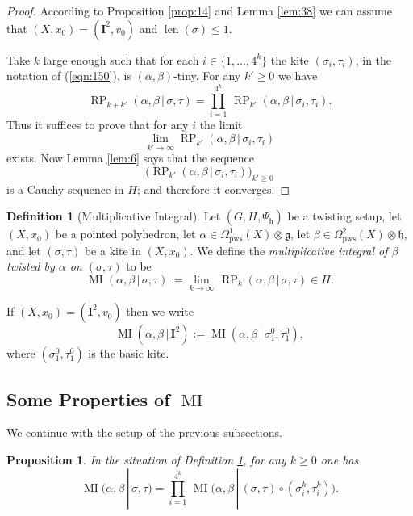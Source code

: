 \documentclass[10pt, a4paper]{amsart}
\newtheorem{prop}[equation]{Proposition}
\theoremstyle{definition}
\newtheorem{dfn}[equation]{Definition}
\numberwithin{equation}{section}
\newcommand{\opn}{\operatorname}
\newcommand{\mfrak}[1]{\mathfrak{#1}}
\newcommand{\mbf}[1]{\mathbf{#1}}
\newcommand{\mrm}[1]{\mathrm{#1}}
\newcommand{\tup}[1]{\textup{#1}}
\renewcommand{\vert}{\, | \,}
\newcommand{\g}{\mfrak{g}}
\newcommand{\h}{\mfrak{h}}
\begin{document}
\begin{proof}
According to Proposition \ref{prop:14} and Lemma \ref{lem:38} we can assume
that $(X, x_0) = (\mbf{I}^2, v_0)$ and 
$\opn{len}(\sigma) \leq 1$. 

Take $k$ large enough such that for each $i \in \{ 1, \ldots, 4^k \}$
the kite $(\sigma_i, \tau_i)$, in the notation of (\ref{eqn:150}), 
is $(\alpha, \beta)$-tiny. For any $k' \geq 0$ we have
\[ \opn{RP}_{k + k'} (\alpha, \beta \vert  \sigma, \tau) = 
\prod_{i = 1}^{4^k}  \, \opn{RP}_{k'}
(\alpha, \beta \vert  \sigma_i, \tau_i) . \]
Thus it suffices to prove that for any $i$ the limit
\[ \lim_{k' \to \infty} \opn{RP}_{k'}(\alpha, \beta \vert  \sigma_i, \tau_i) \]
exists. Now Lemma \ref{lem:6} says that the sequence 
\[ \bigl( \opn{RP}_{k'}(\alpha, \beta \vert  \sigma_i, \tau_i) 
\bigr)_{k' \geq 0} \]
is a Cauchy sequence in $H$; and therefore it converges.
\end{proof}

\begin{dfn}[Multiplicative Integral] \label{dfn:16}
Let $(G, H, \Psi_{\h})$ be a twisting setup, let
$(X, x_0)$ be a pointed polyhedron, let
$\alpha \in \Omega^1_{\mrm{pws}}(X) \otimes \g$, let
$\beta \in \Omega^2_{\mrm{pws}}(X) \otimes \h$, and let
$(\sigma, \tau)$ be a kite in $(X, x_0)$. We define the
{\em multiplicative integral of $\beta$ twisted by
$\alpha$ on $(\sigma, \tau)$} to be
\[ \opn{MI}(\alpha, \beta \vert \sigma, \tau) :=
 \lim_{k \to \infty} \, \opn{RP}_{k}(\alpha, \beta \vert  \sigma, \tau)
\in H . \]

If $(X, x_0) = (\mbf{I}^{2}, v_0)$ then we write
\[  \opn{MI}(\alpha, \beta \vert \mbf{I}^{2}) :=
 \opn{MI}(\alpha, \beta \vert \sigma^0_1, \tau^0_1) , \]
where $(\sigma^0_1, \tau^0_1)$ is the basic kite.
\end{dfn}


\subsection{Some Properties of $\opn{MI}$}
We continue with the setup of the previous subsections.

\begin{prop} \label{prop:3}
In the situation of Definition \tup{\ref{dfn:16}}, for any $k \geq 0$ one
has
\[ \opn{MI}(\alpha, \beta \vert \sigma, \tau) =
\prod_{i = 1}^{4^k} \,
\opn{MI} \bigl( \alpha, \beta \vert (\sigma, \tau) \circ 
(\sigma^k_i, \tau^k_i) \bigr) . \]
\end{prop}
\end{document}
